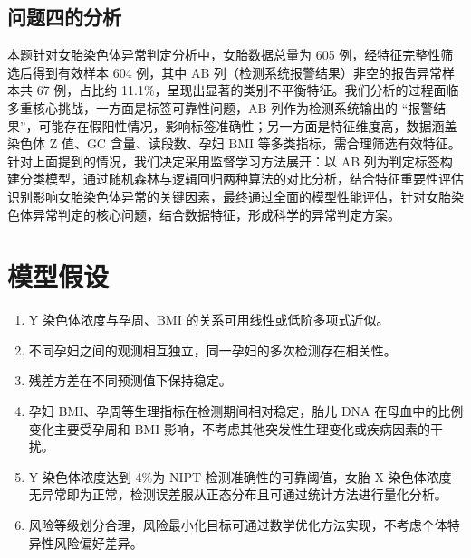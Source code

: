 \documentclass[withoutpreface,bwprint]{cumcmthesis} %
\begin{document}
\subsection{问题四的分析}
本题针对女胎染色体异常判定分析中，女胎数据总量为 605 例，经特征完整性筛选后得到有效样本 604 例，其中 AB 列（检测系统报警结果）非空的报告异常样本共 67 例，占比约 11.1\%，呈现出显著的类别不平衡特征。我们分析的过程面临多重核心挑战，一方面是标签可靠性问题，AB 列作为检测系统输出的 “报警结果”，可能存在假阳性情况，影响标签准确性；另一方面是特征维度高，数据涵盖染色体 Z 值、GC 含量、读段数、孕妇 BMI 等多类指标，需合理筛选有效特征。针对上面提到的情况，我们决定采用监督学习方法展开：以 AB 列为判定标签构建分类模型，通过随机森林与逻辑回归两种算法的对比分析，结合特征重要性评估识别影响女胎染色体异常的关键因素，最终通过全面的模型性能评估，针对女胎染色体异常判定的核心问题，结合数据特征，形成科学的异常判定方案。

\section{模型假设}
\begin{enumerate}
    \item Y 染色体浓度与孕周、BMI 的关系可用线性或低阶多项式近似。
    \item 不同孕妇之间的观测相互独立，同一孕妇的多次检测存在相关性。
    \item 残差方差在不同预测值下保持稳定。
    \item 孕妇 BMI、孕周等生理指标在检测期间相对稳定，胎儿 DNA 在母血中的比例变化主要受孕周和 BMI 影响，不考虑其他突发性生理变化或疾病因素的干扰。
    \item Y 染色体浓度达到 4\%为 NIPT 检测准确性的可靠阈值，女胎 X 染色体浓度无异常即为正常，检测误差服从正态分布且可通过统计方法进行量化分析。
    \item 风险等级划分合理，风险最小化目标可通过数学优化方法实现，不考虑个体特异性风险偏好差异。
\end{enumerate}

\end{document}

